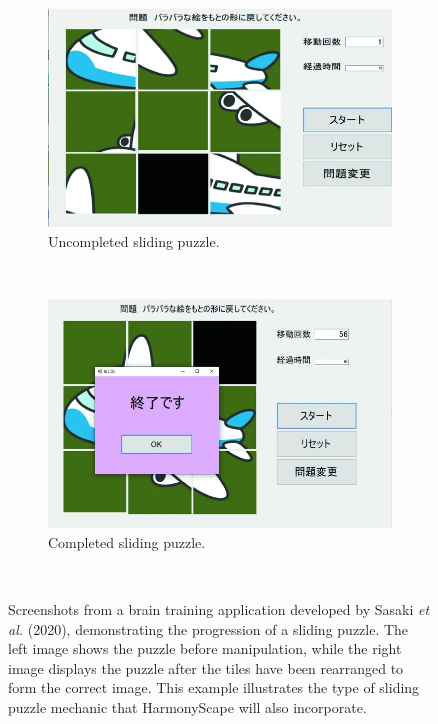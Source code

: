 \documentclass{l4proj}
\begin{document}
\begin{figure}[h]
    \centering
    \begin{subfigure}[b]{0.45\textwidth}
        \includegraphics[width=\textwidth]{dissertation/images/uncompleted_sliding.png}
        \caption{Uncompleted sliding puzzle.}
        \label{fig:slide_uncompleted}
    \end{subfigure}
    ~ 
    \begin{subfigure}[b]{0.45\textwidth}
        \includegraphics[width=\textwidth]{dissertation/images/completed_sliding.png}
        \caption{Completed sliding puzzle.}
        \label{fig:slide_completed}
    \end{subfigure}
    ~  
    \caption{Screenshots from a brain training application developed by Sasaki \emph{et al.} (2020), demonstrating the progression of a sliding puzzle. The left image shows the puzzle before manipulation, while the right image displays the puzzle after the tiles have been rearranged to form the correct image. This example illustrates the type of sliding puzzle mechanic that HarmonyScape will also incorporate.
    }\label{fig:sliding_puzzle}
\end{figure}
\end{document}
